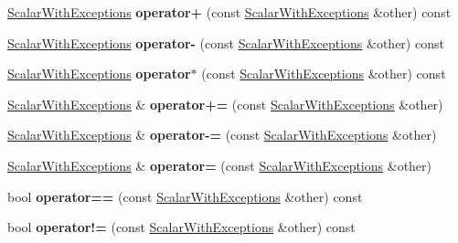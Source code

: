 \begin{DoxyCompactItemize}
\hyperlink{class_scalar_with_exceptions}{Scalar\+With\+Exceptions} {\bfseries operator+} (const \hyperlink{class_scalar_with_exceptions}{Scalar\+With\+Exceptions} \&other) const
\item 
\mbox{\label{class_scalar_with_exceptions_a4ab416e37710005a221039bbda1ec36c}} 
\hyperlink{class_scalar_with_exceptions}{Scalar\+With\+Exceptions} {\bfseries operator-\/} (const \hyperlink{class_scalar_with_exceptions}{Scalar\+With\+Exceptions} \&other) const
\item 
\mbox{\label{class_scalar_with_exceptions_a13ae655fb9164eb3151d8a31908ff281}} 
\hyperlink{class_scalar_with_exceptions}{Scalar\+With\+Exceptions} {\bfseries operator$\ast$} (const \hyperlink{class_scalar_with_exceptions}{Scalar\+With\+Exceptions} \&other) const
\item 
\mbox{\label{class_scalar_with_exceptions_ae5484760cf7befc10df2455d56aabec0}} 
\hyperlink{class_scalar_with_exceptions}{Scalar\+With\+Exceptions} \& {\bfseries operator+=} (const \hyperlink{class_scalar_with_exceptions}{Scalar\+With\+Exceptions} \&other)
\item 
\mbox{\label{class_scalar_with_exceptions_a7d64d07dbd3c3455194349592ba60b91}} 
\hyperlink{class_scalar_with_exceptions}{Scalar\+With\+Exceptions} \& {\bfseries operator-\/=} (const \hyperlink{class_scalar_with_exceptions}{Scalar\+With\+Exceptions} \&other)
\item 
\mbox{\label{class_scalar_with_exceptions_a6e16c719e0fca2cbad17deccfa01a229}} 
\hyperlink{class_scalar_with_exceptions}{Scalar\+With\+Exceptions} \& {\bfseries operator=} (const \hyperlink{class_scalar_with_exceptions}{Scalar\+With\+Exceptions} \&other)
\item 
\mbox{\label{class_scalar_with_exceptions_a74db2bf74730e537966b58229f3b4753}} 
bool {\bfseries operator==} (const \hyperlink{class_scalar_with_exceptions}{Scalar\+With\+Exceptions} \&other) const
\item 
\mbox{\label{class_scalar_with_exceptions_a0e6da882af78d0876e40fcac69915a4b}} 
bool {\bfseries operator!=} (const \hyperlink{class_scalar_with_exceptions}{Scalar\+With\+Exceptions} \&other) const
\end{DoxyCompactItemize}
